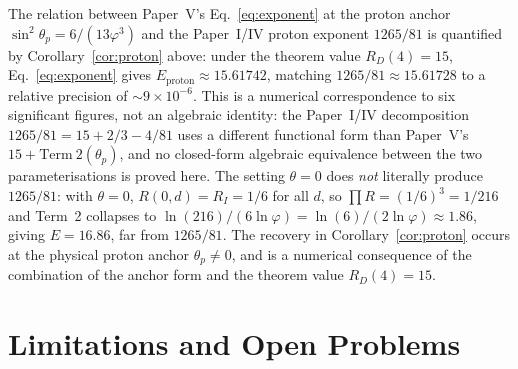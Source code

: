 \documentclass[12pt]{article}
\newcommand{\phig}{\varphi}
\begin{document}
The relation between Paper~V's Eq.~\eqref{eq:exponent} at the proton anchor $\sin^2\theta_p = 6/(13 \phig^3)$ and the Paper~I/IV proton exponent $1265/81$ is quantified by Corollary~\ref{cor:proton} above: under the theorem value $R_D(4) = 15$, Eq.~\eqref{eq:exponent} gives $E_{\mathrm{proton}} \approx 15.61742$, matching $1265/81 \approx 15.61728$ to a relative precision of $\sim 9 \times 10^{-6}$. This is a numerical correspondence to six significant figures, not an algebraic identity: the Paper~I/IV decomposition $1265/81 = 15 + 2/3 - 4/81$ uses a different functional form than Paper~V's $15 + \mathrm{Term~2}(\theta_p)$, and no closed-form algebraic equivalence between the two parameterisations is proved here. The setting $\theta = 0$ does \emph{not} literally produce $1265/81$: with $\theta = 0$, $R(0, d) = R_I = 1/6$ for all $d$, so $\prod R = (1/6)^3 = 1/216$ and Term~2 collapses to $\ln(216)/(6 \ln \phig) = \ln(6)/(2 \ln \phig) \approx 1.86$, giving $E = 16.86$, far from $1265/81$. The recovery in Corollary~\ref{cor:proton} occurs at the physical proton anchor $\theta_p \neq 0$, and is a numerical consequence of the combination of the anchor form and the theorem value $R_D(4) = 15$.

\section{Limitations and Open Problems}\label{sec:limits}
\end{document}
